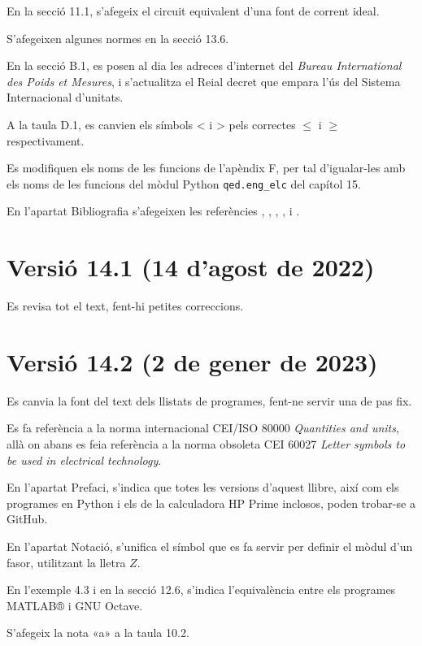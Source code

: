 En la secció 11.1, s'afegeix el circuit equivalent d'una font de corrent ideal.

S'afegeixen algunes normes en la secció 13.6.

En la secció B.1, es posen al dia les adreces d'internet  del \textit{Bureau International des Poids et Mesures}, i s'actualitza el Reial decret que empara l'ús del Sistema Internacional d'unitats.

A la taula D.1, es canvien els símbols < i > pels correctes $\leq$ i $\geq$ respectivament.

Es modifiquen els noms de les funcions de l'apèndix F, per tal d'igualar-les amb els noms de les funcions del mòdul Python \texttt{qed.eng\_elc} del capítol 15.

En l'apartat Bibliografia s'afegeixen les referències \cite{SUM},  \cite{RAM}, \cite{JOH}, \cite{HIL}, \cite{ZUM} i \cite{VAN}.



\section*{Versió 14.1 (14 d'agost de 2022)}

Es revisa tot el text, fent-hi petites correccions.


\section*{Versió 14.2 (2 de gener de 2023)}

Es canvia la font del text dels llistats de programes, fent-ne servir una de pas fix.

Es fa referència a  la norma internacional CEI/ISO 80000 \textit{Quantities and units}, allà on abans es feia referència  a la norma obsoleta CEI 60027 \textit{Letter symbols to be used in electrical technology}.

En l'apartat Prefaci, s'indica que totes les versions d'aquest llibre, així com els programes en Python i els de la calculadora \textsf{HP Prime} inclosos, poden trobar-se a GitHub.

En l'apartat Notació, s'unifica el símbol que es fa servir per definir el mòdul d'un fasor, utilitzant la lletra $Z$.

En l'exemple 4.3 i en la secció  12.6, s'indica l'equivalència entre els programes MATLAB® i GNU Octave.

S'afegeix la nota «a» a la taula 10.2.

